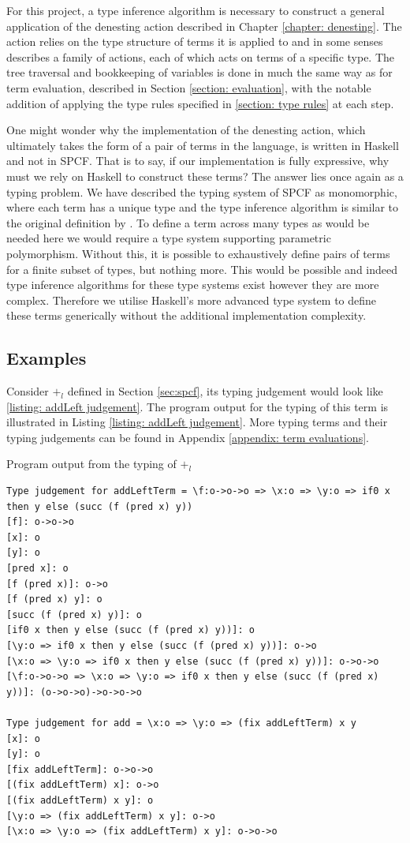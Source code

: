 \documentclass[12pt,a4paper]{report}
\theoremstyle{definition}
\theoremstyle{definition}
\theoremstyle{remark}
\begin{document}
For this project, a type inference algorithm is necessary to construct a general application of the denesting action described in Chapter \ref{chapter: denesting}. The action relies on the type structure of terms it is applied to and in some senses describes a family of actions, each of which acts on terms of a specific type. The tree traversal and bookkeeping of variables is done in much the same way as for term evaluation, described in Section \ref{section: evaluation}, with the notable addition of applying the type rules specified in \ref{section: type rules} at each step.

One might wonder why the implementation of the denesting action, which ultimately takes the form of a pair of terms in the language, is written in Haskell and not in SPCF. That is to say, if our implementation is fully expressive, why must we rely on Haskell to construct these terms? The answer lies once again as a typing problem. We have described the typing system of SPCF as monomorphic, where each term has a unique type and the type inference algorithm is similar to the original definition by \cite{curry1958combinatory}. To define a term across many types as would be needed here we would require a type system supporting parametric polymorphism. Without this, it is possible to exhaustively define pairs of terms for a finite subset of types, but nothing more. This would be possible and indeed type inference algorithms for these type systems exist \cite[\emph{e.g.},][]{hindley_1969, milner_1978} however they are more complex. Therefore we utilise Haskell's more advanced type system to define these terms generically without the additional implementation complexity. 

\subsection{Examples}
Consider $+_l$ defined in Section \ref{sec:spcf}, its typing judgement would look like \ref{listing: addLeft judgement}. The program output for the typing of this term is illustrated in Listing \ref{listing: addLeft judgement}. More typing terms and their typing judgements can be found in Appendix \ref{appendix: term evaluations}.
\begin{listing}
\caption{Program output from the typing of $+_l$}
\label{listing: addLeft judgement}
\begin{verbatim}
Type judgement for addLeftTerm = \f:o->o->o => \x:o => \y:o => if0 x then y else (succ (f (pred x) y))
[f]: o->o->o
[x]: o
[y]: o
[pred x]: o
[f (pred x)]: o->o
[f (pred x) y]: o
[succ (f (pred x) y)]: o
[if0 x then y else (succ (f (pred x) y))]: o
[\y:o => if0 x then y else (succ (f (pred x) y))]: o->o
[\x:o => \y:o => if0 x then y else (succ (f (pred x) y))]: o->o->o
[\f:o->o->o => \x:o => \y:o => if0 x then y else (succ (f (pred x) y))]: (o->o->o)->o->o->o

Type judgement for add = \x:o => \y:o => (fix addLeftTerm) x y
[x]: o
[y]: o
[fix addLeftTerm]: o->o->o
[(fix addLeftTerm) x]: o->o
[(fix addLeftTerm) x y]: o
[\y:o => (fix addLeftTerm) x y]: o->o
[\x:o => \y:o => (fix addLeftTerm) x y]: o->o->o
\end{verbatim}
\end{listing}
\end{document}
